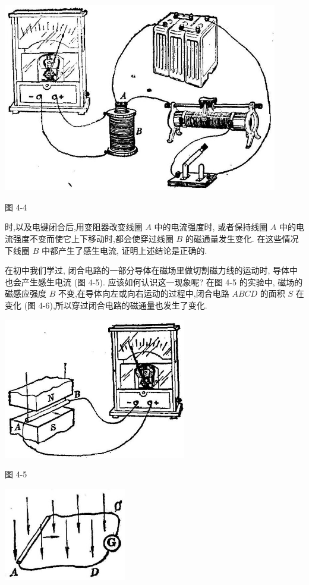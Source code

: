 \documentclass[10pt]{article}
\begin{document}
\begin{center}
\includegraphics[max width=0.9\textwidth]{images/01913056-1f15-74d8-9184-9aab52c9d66b_135_572296.jpg}
\end{center}

图 4-4

时,以及电键闭合后,用变阻器改变线圈 \(A\) 中的电流强度时, 或者保持线圈 \(A\) 中的电流强度不变而使它上下移动时,都会使穿过线圈 \(B\) 的磁通量发生变化. 在这些情况下线圈 \(B\) 中都产生了感生电流, 证明上述结论是正确的.

在初中我们学过, 闭合电路的一部分导体在磁场里做切割磁力线的运动时, 导体中也会产生感生电流 (图 4-5). 应该如何认识这一现象呢? 在图 4-5 的实验中, 磁场的磁感应强度 \(B\) 不变,在导体向左或向右运动的过程中,闭合电路 \({ABCD}\) 的面积 \(S\) 在变化 (图 4-6),所以穿过闭合电路的磁通量也发生了变化.

\begin{center}
\includegraphics[max width=0.6\textwidth]{images/01913056-1f15-74d8-9184-9aab52c9d66b_135_880260.jpg}
\end{center}

图 4-5

\begin{center}
\includegraphics[max width=0.4\textwidth]{images/01913056-1f15-74d8-9184-9aab52c9d66b_135_647039.jpg}
\end{center}
\end{document}
